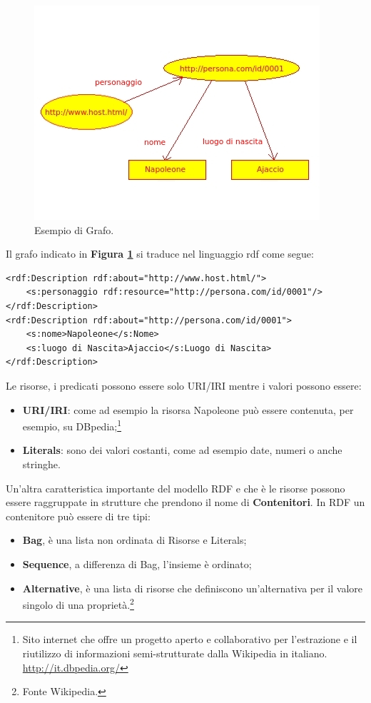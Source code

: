 \documentclass[a4paper,11pt]{article}
\begin{document}
\begin{figure}[ht]
	\centering
	\includegraphics[scale=1]{Napoleone.jpeg}
	\caption{Esempio di Grafo.}
	\label{fig:4}
\end{figure}
Il grafo indicato in \textbf{Figura \ref{fig:4}} si traduce nel linguaggio rdf come segue:
\begin{lstlisting}[style=htmlcssjs]
<rdf:Description rdf:about="http://www.host.html/">
	<s:personaggio rdf:resource="http://persona.com/id/0001"/>
</rdf:Description>
<rdf:Description rdf:about="http://persona.com/id/0001">
 	<s:nome>Napoleone</s:Nome>
 	<s:luogo di Nascita>Ajaccio</s:Luogo di Nascita>
</rdf:Description>

\end{lstlisting}
Le risorse, i predicati possono essere solo URI/IRI mentre i valori possono essere:
\begin{itemize}
	\item \textbf{URI/IRI}: come ad esempio la risorsa Napoleone può essere contenuta, per esempio, su DBpedia;\footnote{Sito internet che offre un progetto aperto e collaborativo per l’estrazione e il riutilizzo di informazioni semi-strutturate dalla Wikipedia in italiano. \url{http://it.dbpedia.org/}}
	\item \textbf{Literals}: sono dei valori costanti, come ad esempio date, numeri o anche stringhe.
\end{itemize}
Un'altra caratteristica importante del modello RDF e che è le risorse possono essere raggruppate in strutture che prendono il nome di \textbf{Contenitori}. In RDF un contenitore può essere di tre tipi:
\begin{itemize}
	\item \textbf{Bag}, è una lista non ordinata di Risorse e Literals;
	\item \textbf{Sequence}, a differenza di Bag, l'insieme è ordinato;
	\item \textbf{Alternative}, è una lista di risorse che definiscono un'alternativa per il valore singolo di una proprietà.\footnote{Fonte Wikipedia.}
\end{itemize} 
\end{document}
